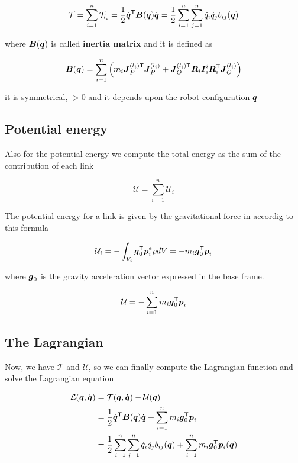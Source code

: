 \[
	\mathcal{T} =
	\sum_{i=1}^n \mathcal{T}_{l_i} =
	\frac{1}{2} \dot{\boldsymbol{q}}^{\mathsf{T}} \boldsymbol{B}(\boldsymbol{q}) \dot{\boldsymbol{q}} =
	\frac{1}{2} \sum_{i=1}^n \sum_{j=1}^n \dot{q}_i \dot{q}_j b_{ij}(\boldsymbol{q})
\]

where $\boldsymbol{B}(\boldsymbol{q})$ is called \textbf{inertia matrix} and it is defined as

\[
	\boldsymbol{B}(\boldsymbol{q}) = \sum_{i=1}^n \left(
	m_i \boldsymbol{J}_P^{(l_i)\mathsf{T}} \boldsymbol{J}_P^{(l_i)} +
	\boldsymbol{J}_O^{(l_i)\mathsf{T}} \boldsymbol{R}_i \boldsymbol{I}_i^i \boldsymbol{R}_i^{\mathsf{T}} \boldsymbol{J}_O^{(l_i)}
	\right)
\]

it is symmetrical, $> 0$ and it depends upon the robot configuration $\boldsymbol{q}$

\subsection{Potential energy}

Also for the potential energy we compute the total energy as the sum of the contribution of each link

\[
	\mathcal{U} = \sum_{i=1}^n \mathcal{U}_i
\]

The potential energy for a link is given by the gravitational force in accordig to this formula

\[
	\mathcal{U}_i = - \int_{V_i} \boldsymbol{g}_0^{\mathsf{T}} \boldsymbol{p}_i^* \rho dV =
	- m_i \boldsymbol{g}_0^{\mathsf{T}} \boldsymbol{p}_i
\]

where $\boldsymbol{g}_0$ is the gravity acceleration vector expressed in the base frame.

\[
	\mathcal{U} = - \sum_{i=1}^n m_i \boldsymbol{g}_0^{\mathsf{T}} \boldsymbol{p}_i
\]

\subsection{The Lagrangian}

Now, we have $\mathcal{T}$ and $\mathcal{U}$, so we can finally compute the Lagrangian function and solve the Lagrangian equation

\begin{align*}
    \mathcal{L}(\boldsymbol{q},\dot{\boldsymbol{q}}) &= \mathcal{T}(\boldsymbol{q},\dot{\boldsymbol{q}}) - \mathcal{U}(\boldsymbol{q}) \\
    &= \frac{1}{2} \dot{\boldsymbol{q}}^{\mathsf{T}} \boldsymbol{B}(\boldsymbol{q}) \dot{\boldsymbol{q}} + \sum_{i=1}^n m_i \boldsymbol{g}_0^{\mathsf{T}} \boldsymbol{p}_i \\
    &= \frac{1}{2} \sum_{i=1}^n \sum_{j=1}^n \dot{q}_i \dot{q}_j b_{ij}(\boldsymbol{q}) + \sum_{i=1}^n m_i \boldsymbol{g}_0^{\mathsf{T}} \boldsymbol{p}_i(\boldsymbol{q})
\end{align*}

